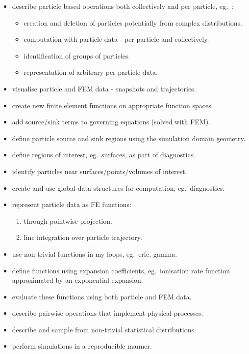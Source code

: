 \begin{itemize}
\item describe particle based operations both collectively and per particle,
  eg.\ :
\begin{itemize}
\item creation and deletion of particles potentially from complex
  distributions.
\item computation with particle data - per particle and collectively.
\item identification of groups of particles.
\item representation of arbitrary per particle data.
\end{itemize}
\item visualise particle and FEM data - snapshots and trajectories.
\item create new finite element functions on appropriate function spaces.
\item add source/sink terms to governing equations (solved with FEM).
\item define particle source and sink regions using the simulation domain
  geometry.
\item define regions of interest, eg.\ surfaces, as part of diagnostics.
\item identify particles near surfaces/points/volumes of interest.
\item create and use global data structures for computation,
  eg.\ diagnostics.
\item represent particle data as FE functions:

  \begin{enumerate}
  \def\labelenumi{\arabic{enumi}.}
  \item through pointwise projection.
  \item line integration over particle trajectory.
  \end{enumerate}
\item use non-trivial functions in my loops, eg.\ erfc, gamma.
\item define functions using expansion coefficients, eg.\ ionisation rate
  function approximated by an exponential expansion.
\item evaluate these functions using both particle and FEM data.
\item describe pairwise operations that implement physical processes.
\item describe and sample from non-trivial statistical distributions.
\item perform simulations in a reproducible manner.
\end{itemize}

